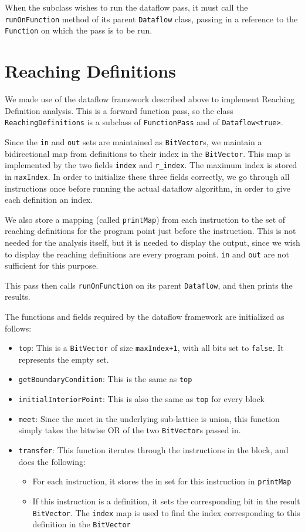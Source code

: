 \documentclass[12pt]{article}
\begin{document}
When the subclass wishes to run the dataflow pass, it must call the \verb|runOnFunction| method of its parent \verb|Dataflow| class, passing in a reference to the \verb|Function| on which the pass is to be run.

\section{Reaching Definitions}
We made use of the dataflow framework described above to implement Reaching Definition analysis. This is a forward function pass, so the class \verb|ReachingDefinitions| is a subclass of \verb|FunctionPass| and of \verb|Dataflow<true>|.

Since the \verb|in| and \verb|out| sets are maintained as \verb|BitVector|s, we maintain a bidirectional map from definitions to their index in the \verb|BitVector|. This map is implemented by the two fields \verb|index| and \verb|r_index|. The maximum index is stored in \verb|maxIndex|. In order to initialize these three fields correctly, we go through all instructions once before running the actual dataflow algorithm, in order to give each definition an index.

We also store a mapping (called \verb|printMap|) from each instruction to the set of reaching definitions for the program point just before the instruction. This is not needed for the analysis itself, but it is needed to display the output, since we wish to display the reaching definitions are every program point. \verb|in| and \verb|out| are not sufficient for this purpose.

This pass then calls \verb|runOnFunction| on its parent \verb|Dataflow|, and then prints the results.

The functions and fields required by the dataflow framework are initialized as follows:
\begin{itemize}
\item \verb|top|: This is a \verb|BitVector| of size \verb|maxIndex+1|, with all bits set to \verb|false|. It represents the empty set.
\item \verb|getBoundaryCondition|: This is the same as \verb|top|
\item \verb|initialInteriorPoint|: This is also the same as \verb|top| for every block
\item \verb|meet|: Since the meet in the underlying sub-lattice is union, this function simply takes the bitwise OR of the two \verb|BitVector|s passed in.
\item \verb|transfer|: This function iterates through the instructions in the block, and does the following:
\begin{itemize}
  \item For each instruction, it stores the in set for this instruction in \verb|printMap|
  \item If this instruction is a definition, it sets the corresponding bit in the result \verb|BitVector|. The \verb|index| map is used to find the index corresponding to this definition in the \verb|BitVector|
\end{itemize}
\end{itemize}
\end{document}
